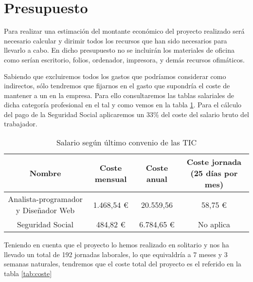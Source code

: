 
\section{Presupuesto}

Para realizar una estimación del montante económico del proyecto realizado será
necesario calcular y dirimir todos los recursos que han sido necesarios para
llevarlo a cabo. En dicho presupuesto no se incluirán los materiales de oficina
como serían escritorio, folios, ordenador, impresora, y demás recursos
ofimáticos.

Sabiendo que excluiremos todos los gastos que podríamos considerar como
indirectos, sólo tendremos que fijarnos en el gasto que supondría el coste de
mantener a un  en la
empresa. Para ello consultaremos las tablas salariales de dicha categoría
profesional en el  tal
y como vemos en la tabla \ref{tab:salario}. Para el cálculo del pago de la
Seguridad Social aplicaremos un 33\% del coste del salario bruto del trabajador.

\begin{table}[H]
  \begin{center}
    \begin{tabular}{| c | c | c | c |}
      \hline
      Nombre & Coste mensual & Coste anual & Coste jornada (25 días por mes)\\ \hline
      Analista-programador y Diseñador Web & 1.468,54 \euro & 20.559,56
      & 58,75 \euro\\ \hline
      Seguridad Social & 484,82 \euro & 6.784,65 \euro & No aplica \\
      \hline
    \end{tabular}
  \end{center}
  \caption{Salario según último convenio de las TIC}
  \label{tab:salario}
\end{table}


Teniendo en cuenta que el proyecto lo hemos realizado en solitario y nos ha
llevado un total de 192 jornadas laborales, lo que equivaldría a 7 meses y 3
semanas naturales, tendremos que el coste total del proyecto es el referido en
la tabla \ref{tab:coste}

